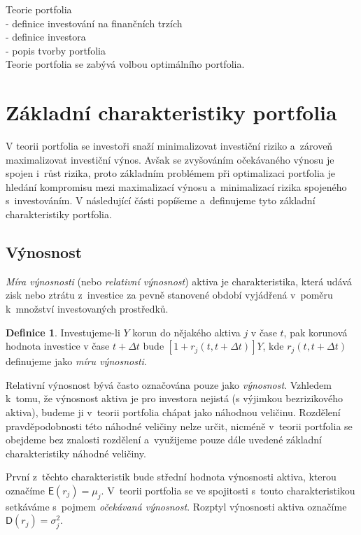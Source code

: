 \documentclass[a4paper,12pt]{report}
\theoremstyle{definition} \newtheorem{definice}[veta]{Definice}
\theoremstyle{remark}
\begin{document}
Teorie portfolia\\
- definice investování na finančních trzích\\
- definice investora\\
- popis tvorby portfolia\\

Teorie portfolia se zabývá volbou optimálního portfolia.



\section{Základní charakteristiky portfolia}\label{charakteristiky_portfolia}
V teorii portfolia se investoři snaží minimalizovat investiční riziko a~zároveň maximalizovat investiční výnos. 
Avšak se zvyšováním očekávaného výnosu je spojen i~růst rizika, proto základním problémem při optimalizaci portfolia je hledání kompromisu mezi maximalizací výnosu a~minimalizací rizika spojeného s~investováním.  
V následující části popíšeme a~definujeme tyto základní charakteristiky portfolia.

\subsection{Výnosnost}
\textit{Míra výnosnosti} (nebo \textit{relativní výnosnost}) aktiva je charakteristika, která udává zisk nebo ztrátu z~investice za pevně stanovené období vyjádřená v~poměru k~množství investovaných prostředků.

\begin{definice}
Investujeme-li $Y$ korun do nějakého aktiva $j$ v čase $t$, pak korunová hodnota investice v čase $t+\Delta t$ bude $[1+r_j(t,t+\Delta t)]Y$, kde  $r_j(t,t+\Delta t)$ definujeme jako \textit{míru výnosnosti}.  
\end{definice}
 
Relativní výnosnost bývá často označována pouze jako \textit{výnosnost}.
Vzhledem k~tomu, že výnosnost aktiva je pro investora nejistá (s výjimkou bezrizikového aktiva), budeme ji v~teorii portfolia chápat jako náhodnou veličinu. %
Rozdělení pravděpodobnosti této náhodné veličiny nelze určit, nicméně v~teorii portfolia se obejdeme bez znalosti rozdělení a~využijeme pouze dále uvedené základní charakteristiky náhodné veličiny.

První z~těchto charakteristik bude střední hodnota výnosnosti aktiva, kterou označíme $\mathsf{E}(r_j)=\mu_j$.
V~teorii portfolia se ve spojitosti s~touto charakteristikou setkáváme s~pojmem \textit{očekávaná výnosnost}.
Rozptyl výnosnosti aktiva označíme $\mathsf{D}(r_j)=\sigma_j^2$.
\end{document}
